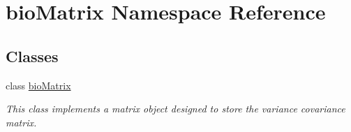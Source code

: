 \hypertarget{namespacebio_matrix}{\section{bio\+Matrix Namespace Reference}
\label{namespacebio_matrix}
}
\subsection*{Classes}
\begin{DoxyCompactItemize}
\item 
class \hyperlink{classbio_matrix_1_1bio_matrix}{bio\+Matrix}
\begin{DoxyCompactList}\small\item\em This class implements a matrix object designed to store the variance covariance matrix. \end{DoxyCompactList}\end{DoxyCompactItemize}
